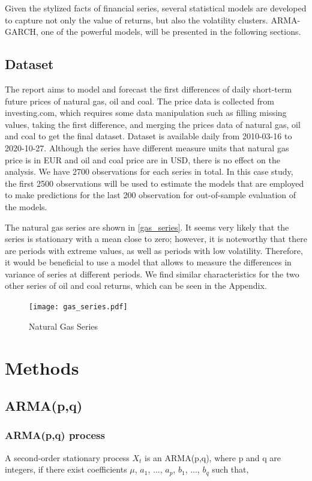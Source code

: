 \documentclass[12pt,a4paper]{article}
\newcommand\colorAutoref[1]{{\hypersetup{linkcolor=black}\autoref{#1}}}
\numberwithin{equation}{section}
\begin{document}
Given the stylized facts of financial series, several statistical models are developed to capture not only the value of returns, but also the volatility clusters. ARMA-GARCH, one of the powerful models, will be presented in the following sections.

\subsection{Dataset}
The report aims to model and forecast the first differences of daily short-term future prices of natural gas, oil and coal. The price data is collected from investing.com, which requires some data manipulation such as filling missing values, taking the first difference, and merging the prices data of natural gas, oil and coal to get the final dataset. Dataset is available daily from 2010-03-16 to 2020-10-27. Although the series have different measure units that natural gas price is in EUR and oil and coal price are in USD, there is no effect on the analysis.  We have 2700 observations for each series in total. In this case study, the first 2500 observations will be used to estimate the models that are employed to make predictions for the last 200 observation for out-of-sample evaluation of the models. 

The natural gas series are shown in \colorAutoref{gas_series}. It seems very likely that the series is stationary with a mean close to zero; however, it is noteworthy that there are periods with extreme values, as well as periods with low volatility. Therefore, it would be beneficial to use a model that allows to measure the differences in variance of series at different periods. We find similar characteristics for the two other series of oil and coal returns, which can be seen in the Appendix.

\vspace{-5mm}
 \begin{figure}[h!] 
\texttt{[image: gas\_series.pdf]}
\vspace*{-23mm}
\caption{Natural Gas Series}
\label{gas_series}
\end{figure}

\section{Methods}
\subsection{ARMA(p,q)}
\subsubsection{ARMA(p,q) process}
A second-order stationary process {$X_t$} is an ARMA(p,q), where p and q are integers, if there exist coefficients $\mu$, $a_1$, ..., $a_p$, $b_1$, ..., $b_q$ such that,
\end{document}
